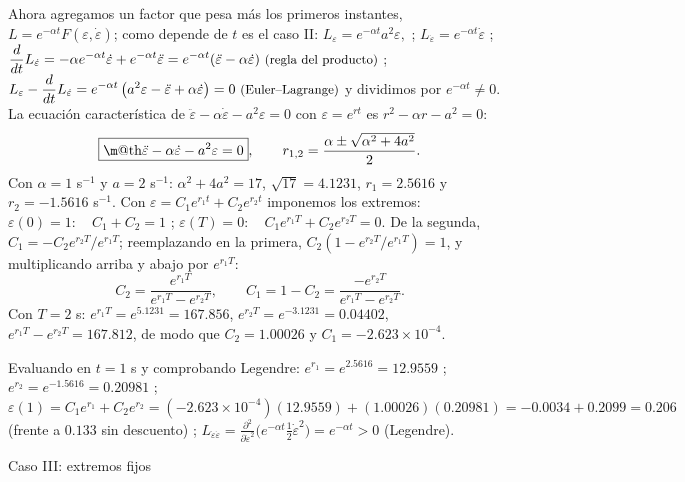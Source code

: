 \documentclass[11pt,a4paper]{article}
\makeatletter
\numberwithin{equation}{section}
\renewcommand\subsection{\@startsection{subsection}{2}{\z@}{-2.8ex plus -1ex minus -.2ex}{1.0ex plus .2ex}%
  {\normalfont\pincel\LARGE\color{rojo}}}
\renewcommand{\boxed}[1]{\fbox{\m@th$\displaystyle #1$}}
\makeatother
\begin{document}
Ahora agregamos un factor que pesa más los primeros instantes, $L = e^{-\alpha t}F(\varepsilon, \dot\varepsilon)$; como depende de $t$ es el caso II:
$\displaystyle L_\varepsilon  = e^{-\alpha t}a^2\varepsilon, $ ; $\displaystyle L_{\dot\varepsilon} = e^{-\alpha t}\dot\varepsilon$ ; $\displaystyle \frac{d}{dt}L_{\dot\varepsilon}  = -\alpha e^{-\alpha t}\dot\varepsilon + e^{-\alpha t}\ddot\varepsilon = e^{-\alpha t}(\ddot\varepsilon - \alpha\dot\varepsilon) \ \text{\small(regla del producto)}$ ; $\displaystyle L_\varepsilon - \frac{d}{dt}L_{\dot\varepsilon}  = e^{-\alpha t}\left(a^2\varepsilon - \ddot\varepsilon + \alpha\dot\varepsilon\right) = 0 \ \text{\small(Euler--Lagrange)}$
y dividimos por $e^{-\alpha t} \neq 0$. La ecuación característica de $\ddot\varepsilon - \alpha\dot\varepsilon - a^2\varepsilon = 0$ con $\varepsilon = e^{rt}$ es $r^2 - \alpha r - a^2 = 0$:
\begin{equation*}
\boxed{\ddot\varepsilon - \alpha\dot\varepsilon - a^2\varepsilon = 0},\qquad r_{1,2} = \frac{\alpha \pm \sqrt{\alpha^2 + 4a^2}}{2}.
\end{equation*}
Con $\alpha = 1$ s$^{-1}$ y $a = 2$ s$^{-1}$: $\alpha^2 + 4a^2 = 17$, $\sqrt{17} = 4.1231$, $r_1 = 2.5616$ y $r_2 = -1.5616$ s$^{-1}$. Con $\varepsilon = C_1e^{r_1t} + C_2e^{r_2t}$ imponemos los extremos:
$\displaystyle \varepsilon(0) = 1: \allowbreak\quad C_1 + C_2 = 1$ ; $\displaystyle \varepsilon(T) = 0: \allowbreak\quad C_1e^{r_1T} + C_2e^{r_2T} = 0 .$
De la segunda, $C_1 = -C_2e^{r_2T}/e^{r_1T}$; reemplazando en la primera, $C_2(1 - e^{r_2T}/e^{r_1T}) = 1$, y multiplicando arriba y abajo por $e^{r_1T}$:
\begin{equation*}
C_2 = \frac{e^{r_1T}}{e^{r_1T} - e^{r_2T}},\qquad C_1 = 1 - C_2 = \frac{-e^{r_2T}}{e^{r_1T} - e^{r_2T}} .
\end{equation*}
Con $T = 2$ s: $e^{r_1T} = e^{5.1231} = 167.856$, $e^{r_2T} = e^{-3.1231} = 0.04402$, $e^{r_1T} - e^{r_2T} = 167.812$, de modo que $C_2 = 1.00026$ y $C_1 = -2.623\times10^{-4}$.

Evaluando en $t = 1$ s y comprobando Legendre:
$e^{r_1} = e^{2.5616} = 12.9559$ ; $e^{r_2} = e^{-1.5616} = 0.20981$ ; $\varepsilon(1) = C_1e^{r_1} + C_2e^{r_2} = (-2.623\times10^{-4})(12.9559) + (1.00026)(0.20981) = -0.0034 + 0.2099 = 0.206$ (frente a $0.133$ sin descuento) ; $L_{\dot\varepsilon\dot\varepsilon} = \frac{\partial^2}{\partial\dot\varepsilon^2}\bigl(e^{-\alpha t}\tfrac12\dot\varepsilon^2\bigr) = e^{-\alpha t} > 0$ (Legendre).

\subsection{Caso III: extremos fijos}
\label{sec:caso3}
\end{document}
